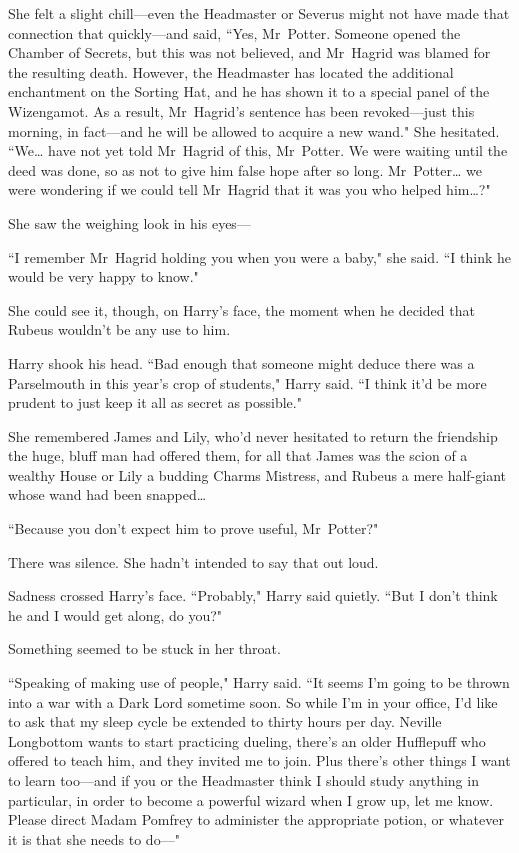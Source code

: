 She felt a slight chill—even the Headmaster or Severus might not have made that connection that quickly—and said, ``Yes, Mr~Potter. Someone opened the Chamber of Secrets, but this was not believed, and Mr~Hagrid was blamed for the resulting death. However, the Headmaster has located the additional enchantment on the Sorting Hat, and he has shown it to a special panel of the Wizengamot. As a result, Mr~Hagrid's sentence has been revoked—just this morning, in fact—and he will be allowed to acquire a new wand." She hesitated. ``We{\ldots} have not yet told Mr~Hagrid of this, Mr~Potter. We were waiting until the deed was done, so as not to give him false hope after so long. Mr~Potter{\ldots} we were wondering if we could tell Mr~Hagrid that it was you who helped him{\ldots}?"

She saw the weighing look in his eyes—

``I remember Mr~Hagrid holding you when you were a baby," she said. ``I think he would be very happy to know."

She could see it, though, on Harry's face, the moment when he decided that Rubeus wouldn't be any use to him.

Harry shook his head. ``Bad enough that someone might deduce there was a Parselmouth in this year's crop of students," Harry said. ``I think it'd be more prudent to just keep it all as secret as possible."

She remembered James and Lily, who'd never hesitated to return the friendship the huge, bluff man had offered them, for all that James was the scion of a wealthy House or Lily a budding Charms Mistress, and Rubeus a mere half-giant whose wand had been snapped{\ldots}

``Because you don't expect him to prove useful, Mr~Potter?"

There was silence. She hadn't intended to say that out loud.

Sadness crossed Harry's face. ``Probably," Harry said quietly. ``But I don't think he and I would get along, do you?"

Something seemed to be stuck in her throat.

``Speaking of making use of people," Harry said. ``It seems I'm going to be thrown into a war with a Dark Lord sometime soon. So while I'm in your office, I'd like to ask that my sleep cycle be extended to thirty hours per day. Neville Longbottom wants to start practicing dueling, there's an older Hufflepuff who offered to teach him, and they invited me to join. Plus there's other things I want to learn too—and if you or the Headmaster think I should study anything in particular, in order to become a powerful wizard when I grow up, let me know. Please direct Madam Pomfrey to administer the appropriate potion, or whatever it is that she needs to do—"

